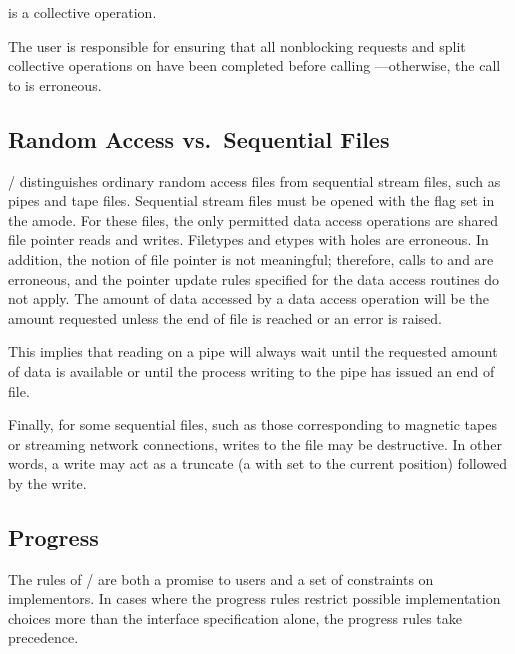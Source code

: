  is a collective operation.

The user is responsible for ensuring that all nonblocking requests
and split collective operations
on  have been completed before calling
---otherwise, the call to
 is erroneous.

\subsection{Random Access vs.\ Sequential Files}
\MPI/ distinguishes ordinary random access files from sequential
stream files, such as pipes and tape files.
Sequential stream files must be opened with the 
flag set in the amode.
For these files,
the only permitted data access operations are
shared file pointer reads and writes.
Filetypes and etypes with holes are erroneous.
In addition, the notion of file pointer is not meaningful;
therefore, calls to  and
 are erroneous,
and the pointer update rules specified for the data access routines
do not apply.
The amount of data accessed by a data access operation will be
the amount requested unless
the end of file is reached or an error is raised.

\begin{rationale}
This implies that reading on a pipe will always wait until the
requested amount of data is available or until the process
writing to the pipe has issued an end of file.
\end{rationale}

Finally,
for some sequential files,
such as those corresponding to magnetic tapes or streaming network connections,
writes to the file may be destructive.
In other words, a write may act as a truncate
(a  with  set to the current position)
followed by the write.

\subsection{Progress}
\label{sec:io-intro-progress}
The 
rules of \MPI/ are both a promise to users
and a set of constraints on implementors.
In cases where the progress rules restrict
possible implementation choices more than the interface specification alone,
the progress rules take precedence.

